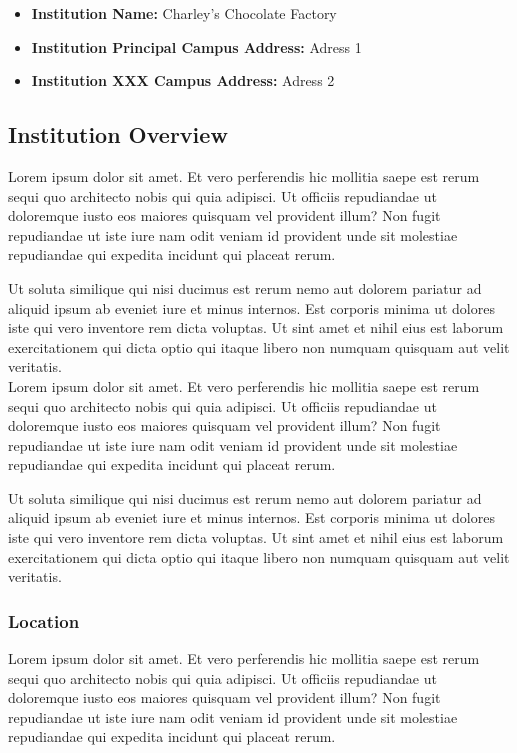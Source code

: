 \documentclass[12pt]{article}
\begin{document}
\begin{itemize}
    \item \textbf{Institution Name:} Charley's Chocolate Factory
    \item  \textbf{Institution Principal Campus Address:} Adress 1
    \item  \textbf{Institution XXX Campus Address:} Adress 2
\end{itemize}

\subsection{Institution Overview}

\par

Lorem ipsum dolor sit amet. Et vero perferendis hic mollitia saepe est rerum sequi quo architecto nobis qui quia adipisci. Ut officiis repudiandae ut doloremque iusto eos maiores quisquam vel provident illum? Non fugit repudiandae ut iste iure nam odit veniam id provident unde sit molestiae repudiandae qui expedita incidunt qui placeat rerum.

Ut soluta similique qui nisi ducimus est rerum nemo aut dolorem pariatur ad aliquid ipsum ab eveniet iure et minus internos. Est corporis minima ut dolores iste qui vero inventore rem dicta voluptas. Ut sint amet et nihil eius est laborum exercitationem qui dicta optio qui itaque libero non numquam quisquam aut velit veritatis.\\

\noindent Lorem ipsum dolor sit amet. Et vero perferendis hic mollitia saepe est rerum sequi quo architecto nobis qui quia adipisci. Ut officiis repudiandae ut doloremque iusto eos maiores quisquam vel provident illum? Non fugit repudiandae ut iste iure nam odit veniam id provident unde sit molestiae repudiandae qui expedita incidunt qui placeat rerum.

Ut soluta similique qui nisi ducimus est rerum nemo aut dolorem pariatur ad aliquid ipsum ab eveniet iure et minus internos. Est corporis minima ut dolores iste qui vero inventore rem dicta voluptas. Ut sint amet et nihil eius est laborum exercitationem qui dicta optio qui itaque libero non numquam quisquam aut velit veritatis.

\subsubsection{Location}

Lorem ipsum dolor sit amet. Et vero perferendis hic mollitia saepe est rerum sequi quo architecto nobis qui quia adipisci. Ut officiis repudiandae ut doloremque iusto eos maiores quisquam vel provident illum? Non fugit repudiandae ut iste iure nam odit veniam id provident unde sit molestiae repudiandae qui expedita incidunt qui placeat rerum.
\end{document}
